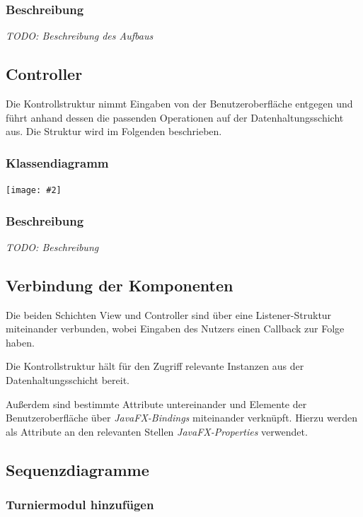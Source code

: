 \documentclass[11pt]{article}
\newcommand{\includediagram}[2]{
	\begin{center}
		\texttt{[image: \#2]}
	\end{center}
}
\begin{document}
\subsubsection{Beschreibung}

\textit{TODO: Beschreibung des Aufbaus}

\subsection{Controller}

Die Kontrollstruktur nimmt Eingaben von der Benutzeroberfläche entgegen und führt anhand dessen die passenden Operationen auf der Datenhaltungsschicht aus. Die Struktur wird im Folgenden beschrieben.

\subsubsection{Klassendiagramm}

\includediagram{1.0}{controller.png}

\subsubsection{Beschreibung}

\textit{TODO: Beschreibung}

\subsection{Verbindung der Komponenten}

Die beiden Schichten View und Controller sind über eine Listener-Struktur miteinander verbunden, wobei Eingaben des Nutzers einen Callback zur Folge haben.

Die Kontrollstruktur hält für den Zugriff relevante Instanzen aus der Datenhaltungsschicht bereit.

Außerdem sind bestimmte Attribute untereinander und Elemente der Benutzeroberfläche über \textit{JavaFX-Bindings} miteinander verknüpft. Hierzu werden als Attribute an den relevanten Stellen \textit{JavaFX-Properties} verwendet.

\subsection{Sequenzdiagramme}

\subsubsection{Turniermodul hinzufügen}
\end{document}
